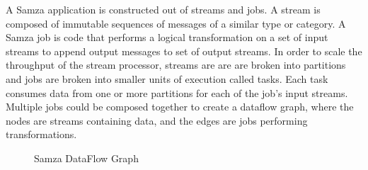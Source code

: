 A Samza application is constructed out of streams and jobs. A stream is composed of immutable sequences of messages of a similar type or category.  A Samza job is code that performs a logical transformation on a set of input streams to append output messages to set of output streams. In order to scale the throughput of the stream processor, streams are are are broken into partitions and jobs are broken into smaller units of execution called tasks. Each task consumes data from one or more partitions for each of the job's input streams. Multiple jobs could be composed together to create a dataflow graph, where the nodes are streams containing data, and the edges are jobs performing transformations. 

\begin{figure}
  \begin{center}
   \caption{Samza DataFlow Graph}
   \label{fig:smaza_dataflow}
  \end{center}
\end{figure}

